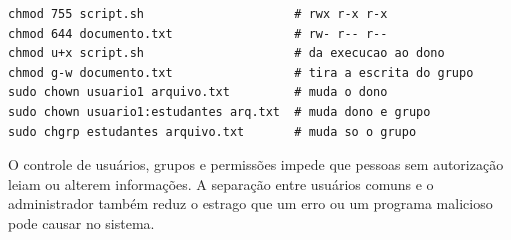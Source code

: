 \begin{lstlisting}[caption={Alteração de permissões, dono e grupo},label={lst:chmod}]
chmod 755 script.sh                     # rwx r-x r-x
chmod 644 documento.txt                 # rw- r-- r--
chmod u+x script.sh                     # da execucao ao dono
chmod g-w documento.txt                 # tira a escrita do grupo
sudo chown usuario1 arquivo.txt         # muda o dono
sudo chown usuario1:estudantes arq.txt  # muda dono e grupo
sudo chgrp estudantes arquivo.txt       # muda so o grupo
\end{lstlisting}

O controle de usuários, grupos e permissões impede que pessoas sem autorização leiam ou alterem
informações. A separação entre usuários comuns e o administrador também reduz o estrago que um
erro ou um programa malicioso pode causar no sistema.
